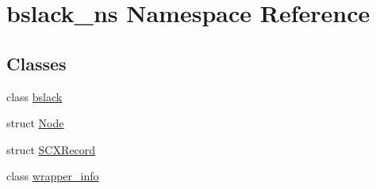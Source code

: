 \hypertarget{namespacebslack__ns}{}\section{bslack\+\_\+ns Namespace Reference}
\label{namespacebslack__ns}
\subsection*{Classes}
\begin{DoxyCompactItemize}
\item 
class \hyperlink{classbslack__ns_1_1bslack}{bslack}
\item 
struct \hyperlink{structbslack__ns_1_1Node}{Node}
\item 
struct \hyperlink{structbslack__ns_1_1SCXRecord}{S\+C\+X\+Record}
\item 
class \hyperlink{classbslack__ns_1_1wrapper__info}{wrapper\+\_\+info}
\end{DoxyCompactItemize}
